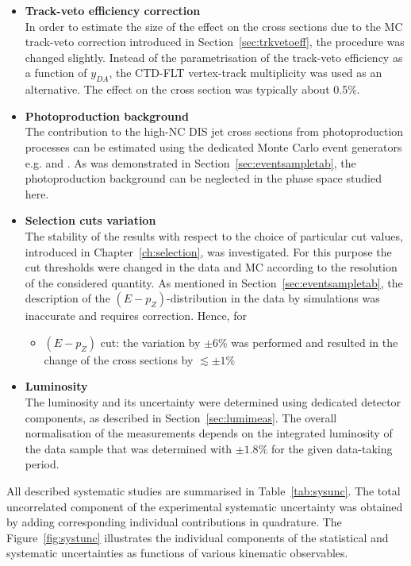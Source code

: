 \begin{itemize}
	\item \textbf{Track-veto efficiency correction}\\
		In order to estimate the size of the effect on the cross sections due to the MC track-veto correction introduced in Section~\ref{sec:trkvetoeff}, the procedure was changed slightly. Instead of the parametrisation of the track-veto efficiency as a function of $y_{DA}$, the CTD-FLT vertex-track multiplicity was used as an alternative. The effect on the cross section was typically about 0.5\%.
	
	\item \textbf{Photoproduction background}\\
		The contribution to the high-\qsq NC DIS jet cross sections from photoproduction processes can be estimated using the dedicated Monte Carlo event generators e.g. \pythia and \herwig. As was demonstrated in Section~\ref{sec:eventsampletab}, the photoproduction background can be neglected in the phase space studied here.
	
	\item \textbf{Selection cuts variation} \\
		The stability of the results with respect to the choice of particular cut values, introduced in Chapter~\ref{ch:selection}, was investigated. For this purpose the cut thresholds were changed in the data and MC according to the resolution of the considered quantity. As mentioned in Section~\ref{sec:eventsampletab}, the description of the $\left(E-p_Z\right)$-distribution in the data by simulations was inaccurate and requires correction. Hence, for 
		\begin{itemize}
			\item $\left( E-p_Z\right) $ cut: the variation by $\pm6\%$ was performed and resulted in the change of the cross sections by $\lesssim \pm 1\%$
		\end{itemize}
	\item \textbf{Luminosity} \\
		The luminosity and its uncertainty were determined using dedicated detector components, as described in Section~\ref{sec:lumimeas}. The overall normalisation of the measurements depends on the integrated luminosity of the data sample that was determined with $\pm1.8\%$ for the given data-taking period.
\end{itemize}
All described systematic studies are summarised in Table~\ref{tab:sysunc}. The total uncorrelated component of the experimental systematic uncertainty was obtained by adding corresponding individual contributions in quadrature. The Figure~\ref{fig:systunc} illustrates the individual components of the statistical and systematic uncertainties as functions of various kinematic observables.
